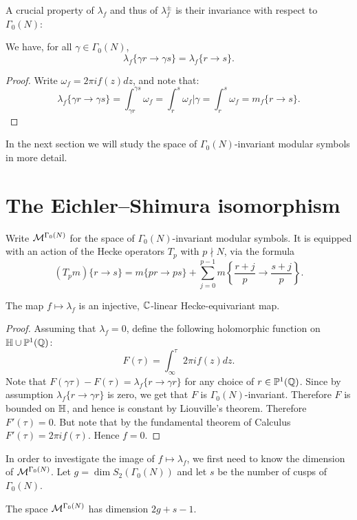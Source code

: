 A crucial property of $\lambda_f$ and thus of $\lambda_f^\pm$ is their invariance with respect to $\Gamma_0(N)$:
\begin{proposition}
  We have, for all $\gamma\in\Gamma_0(N)$,
\[
\lambda_f\{\gamma r\to \gamma s\} = \lambda_f\{r\to s\}.
\]
\end{proposition}
\begin{proof}
  Write $\omega_f = 2\pi i f(z)dz$, and note that:
\[
\lambda_f\{\gamma r\to \gamma s\}=\int_{\gamma r}^{\gamma s}\omega_f = \int_{r}^{s} \omega_f|\gamma = \int_r^s \omega_f=m_f\{r\to s\}.
\]
\end{proof}
In the next section we will study the space of $\Gamma_0(N)$-invariant modular symbols in more detail.

\section{The Eichler--Shimura isomorphism}

Write $\mathcal{M}^{\Gamma_0(N)}$ for the space of $\Gamma_0(N)$-invariant modular symbols. It is equipped with an action of the Hecke operators $T_p$ with $p\nmid N$, via the formula
\[
(T_p m)\{r\to s\} = m\{pr\to ps\} + \sum_{j=0}^{p-1}m\left\{\frac{r+j}{p}\to\frac{s+j}{p}\right\}.
\]

\begin{proposition}
  The map $f\mapsto \lambda_f$ is an injective, $\mathbb{C}$-linear Hecke-equivariant map.
\end{proposition}
\begin{proof}
  Assuming that $\lambda_f=0$, define the following holomorphic function on $\mathbb{H}\cup \mathbb{P}^1(\mathbb{Q})$:
\[
F(\tau) = \int_\infty^\tau 2\pi i f(z)dz.
\]
Note that $F(\gamma\tau)-F(\tau) = \lambda_f\{r\to\gamma r\}$ for any choice of $r\in\mathbb{P}^1(\mathbb{Q})$. Since by assumption $\lambda_f\{r\to\gamma r\}$ is zero, we get that $F$ is $\Gamma_0(N)$-invariant. Therefore $F$ is bounded on $\mathbb{H}$, and hence is constant by Liouville's theorem. Therefore $F'(\tau)=0$. But note that by the fundamental theorem of Calculus $F'(\tau)=2\pi i f(\tau)$. Hence $f=0$.
\end{proof}

In order to investigate the image of $f\mapsto \lambda_f$, we first need to know the dimension of $\mathcal{M}^{\Gamma_0(N)}$. Let $g=\dim S_2(\Gamma_0(N))$ and let $s$ be the number of cusps of $\Gamma_0(N)$.
\begin{theorem}
The space $\mathcal{M}^{\Gamma_0(N)}$ has dimension $2g+s-1$.
\end{theorem}

